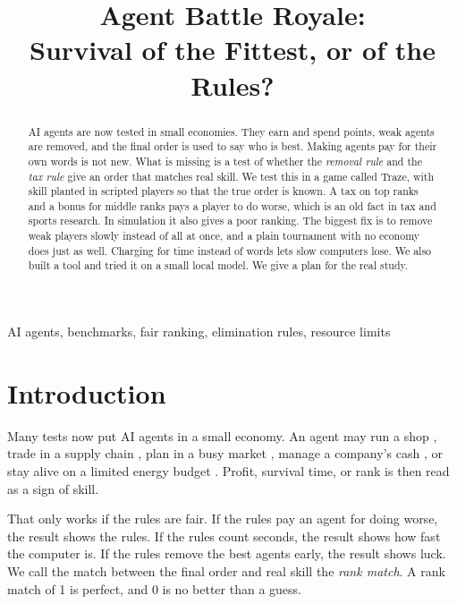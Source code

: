 \documentclass[conference]{IEEEtran}
\theoremstyle{plain}
\newcommand{\todo}[1]{\textcolor{red}{[TODO: #1]}}
\begin{document}
\title{Agent Battle Royale:\\Survival of the Fittest, or of the Rules?}

\author{
\IEEEauthorblockA{Project Traze\\
\todo{affiliations and contact e-mail}}}

\maketitle

\begin{abstract}
AI agents are now tested in small economies. They earn and spend points, weak agents are removed, and the final order is used to say who is best. Making agents pay for their own words is not new. What is missing is a test of whether the \emph{removal rule} and the \emph{tax rule} give an order that matches real skill. We test this in a game called Traze, with skill planted in scripted players so that the true order is known. A tax on top ranks and a bonus for middle ranks pays a player to do worse, which is an old fact in tax and sports research. In simulation it also gives a poor ranking. The biggest fix is to remove weak players slowly instead of all at once, and a plain tournament with no economy does just as well. Charging for time instead of words lets slow computers lose. We also built a tool and tried it on a small local model. We give a plan for the real study.
\end{abstract}

\begin{IEEEkeywords}
AI agents, benchmarks, fair ranking, elimination rules, resource limits
\end{IEEEkeywords}

\section{Introduction}
Many tests now put AI agents in a small economy. An agent may run a shop \cite{backlund2025vendingbench}, trade in a supply chain \cite{zheng2026marketbench,sugiura2026coffeebench}, plan in a busy market \cite{hu2026ecogym}, manage a company's cash \cite{han2026cfo}, or stay alive on a limited energy budget \cite{hansen2026energy}. Profit, survival time, or rank is then read as a sign of skill.

That only works if the rules are fair. If the rules pay an agent for doing worse, the result shows the rules. If the rules count seconds, the result shows how fast the computer is. If the rules remove the best agents early, the result shows luck. We call the match between the final order and real skill the \emph{rank match}. A rank match of 1 is perfect, and 0 is no better than a guess.
\end{document}
